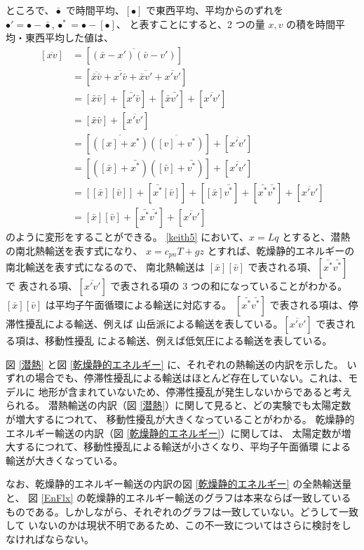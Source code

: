 \documentclass[body]{subfiles}
\begin{document}
ところで、\(\bar\bullet\) で時間平均、\([\bullet]\) で東西平均、平均からのずれを
\(\bullet'=\bullet-\bar\bullet, \bullet^*=\bullet-[\bullet]\)、
と表すことにすると、2 つの量 \(x,v\) の積を時間平均・東西平均した値は、
\begin{equation}
	\begin{split}
		[\overline{xv}]&=[\overline{(\bar x-x')(\bar v-v')}]\\
		&=[\overline{\bar x\bar v}+\overline{x'\bar v}+\overline{\bar xv'}+\overline{x'v'}]\\
		&=[\bar x\bar v]+[\bar{x'}\bar v]+[\bar x\bar{v'}]+[\overline{x'v'}]\\
		&=[\bar x\bar v]+[\overline{x'v'}]\\
		&=[\overline{([x]+x^*)}\overline{([v]+v^*)}]+[\overline{x'v'}]\\
		&=[([\bar x]+\bar{x^*})([\bar v]+\bar{v^*})]+[\overline{x'v'}]\\
		&=[[\bar x][\bar v]]+[\bar{x^*}[\bar v]]+[[\bar x]\bar{v^*}]+[\bar{x^*}\bar{v^*}]+[\overline{x'v'}]\\
		&=[\bar x][\bar v]+[\bar{x^*}\bar{v^*}]+[\overline{x'v'}]
	\end{split}\label{keith5}
\end{equation}
のように変形をすることができる。
\eqref{keith5} において、\(x=Lq\) とすると、潜熱の南北熱輸送を表す式になり、
\(x=c_{pn}T+gz\) とすれば、乾燥静的エネルギーの南北輸送を表す式になるので、
南北熱輸送は \([\bar x][\bar v]\) で表される項、\([\bar{x^*}\bar{v^*}]\) で
表される項、\([\overline{x'v'}]\) で表される項の 3 つの和になっていることがわかる。
\([\bar x][\bar v]\) は平均子午面循環による輸送に対応する。
\([\bar{x^*}\bar{v^*}]\) で表される項は、停滞性擾乱による輸送、例えば
山岳派による輸送を表している。\([\overline{x'v'}]\) で表される項は、移動性擾乱
による輸送、例えば低気圧による輸送を表している。

図 \ref{潜熱} と図 \ref{乾燥静的エネルギー} に、それぞれの熱輸送の内訳を示した。
いずれの場合でも、停滞性擾乱による輸送はほとんど存在していない。これは、モデルに
地形が含まれていないため、停滞性擾乱が発生しないからであると考えられる。
潜熱輸送の内訳（図 \ref{潜熱}）に関して見ると、どの実験でも太陽定数が増大するにつれて、
移動性擾乱が大きくなっていることがわかる。
乾燥静的エネルギー輸送の内訳（図 \ref{乾燥静的エネルギー}）に関しては、
太陽定数が増大するにつれて、移動性擾乱による輸送が小さくなり、平均子午面循環
による輸送が大きくなっている。

なお、乾燥静的エネルギー輸送の内訳の図 \ref{乾燥静的エネルギー} の全熱輸送量と、
図 \ref{EnFlx} の乾燥静的エネルギー輸送のグラフは本来ならば一致している
ものである。しかしながら、それぞれのグラフは一致していない。どうして一致して
いないのかは現状不明であるため、この不一致についてはさらに検討をしなければならない。
\end{document}
